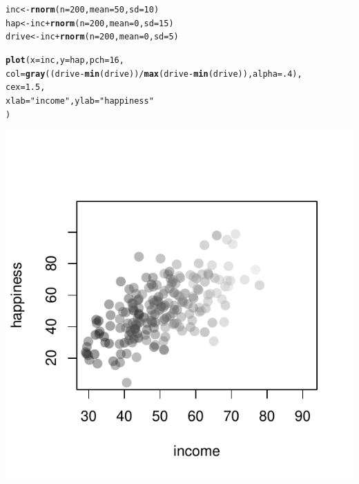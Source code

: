 \documentclass{tufte-book}\usepackage[]{graphicx}\usepackage[]{color}
\makeatletter
\def\maxwidth{ %
  \ifdim\Gin@nat@width>\linewidth
    \linewidth
  \else
    \Gin@nat@width
  \fi
}
\newcommand{\hlnum}[1]{\textcolor[rgb]{0.686,0.059,0.569}{#1}}%
\newcommand{\hlstr}[1]{\textcolor[rgb]{0.192,0.494,0.8}{#1}}%
\newcommand{\hlopt}[1]{\textcolor[rgb]{0,0,0}{#1}}%
\newcommand{\hlstd}[1]{\textcolor[rgb]{0.345,0.345,0.345}{#1}}%
\newcommand{\hlkwb}[1]{\textcolor[rgb]{0.69,0.353,0.396}{#1}}%
\newcommand{\hlkwc}[1]{\textcolor[rgb]{0.333,0.667,0.333}{#1}}%
\newcommand{\hlkwd}[1]{\textcolor[rgb]{0.737,0.353,0.396}{\textbf{#1}}}%
\newenvironment{kframe}{%
 \def\at@end@of@kframe{}%
 \ifinner\ifhmode%
  \def\at@end@of@kframe{\end{minipage}}%
  \begin{minipage}{\columnwidth}%
 \fi\fi%
 \def\FrameCommand##1{\hskip\@totalleftmargin \hskip-\fboxsep
 \colorbox{shadecolor}{##1}\hskip-\fboxsep
     \hskip-\linewidth \hskip-\@totalleftmargin \hskip\columnwidth}%
 \MakeFramed {\advance\hsize-\width
   \@totalleftmargin\z@ \linewidth\hsize
   \@setminipage}}%
 {\par\unskip\endMakeFramed%
 \at@end@of@kframe}
\newenvironment{knitrout}{}{} %
\makeatother
\begin{document}
\begin{footnotesize}
\begin{marginfigure}

\begin{tiny}
\begin{knitrout}
\color{fgcolor}\begin{kframe}
\begin{alltt}
\hlstd{inc} \hlkwb{<-} \hlkwd{rnorm}\hlstd{(}\hlkwc{n} \hlstd{=} \hlnum{200}\hlstd{,} \hlkwc{mean} \hlstd{=} \hlnum{50}\hlstd{,} \hlkwc{sd} \hlstd{=} \hlnum{10}\hlstd{)}
\hlstd{hap} \hlkwb{<-} \hlstd{inc} \hlopt{+} \hlkwd{rnorm}\hlstd{(}\hlkwc{n} \hlstd{=} \hlnum{200}\hlstd{,} \hlkwc{mean} \hlstd{=} \hlnum{0}\hlstd{,} \hlkwc{sd} \hlstd{=} \hlnum{15}\hlstd{)}
\hlstd{drive} \hlkwb{<-} \hlstd{inc} \hlopt{+} \hlkwd{rnorm}\hlstd{(}\hlkwc{n} \hlstd{=} \hlnum{200}\hlstd{,} \hlkwc{mean} \hlstd{=} \hlnum{0}\hlstd{,} \hlkwc{sd} \hlstd{=} \hlnum{5}\hlstd{)}

\hlkwd{plot}\hlstd{(}\hlkwc{x} \hlstd{= inc,} \hlkwc{y} \hlstd{= hap,} \hlkwc{pch} \hlstd{=} \hlnum{16}\hlstd{,}
     \hlkwc{col} \hlstd{=} \hlkwd{gray}\hlstd{((drive} \hlopt{-} \hlkwd{min}\hlstd{(drive))} \hlopt{/} \hlkwd{max}\hlstd{(drive} \hlopt{-} \hlkwd{min}\hlstd{(drive)),} \hlkwc{alpha} \hlstd{=} \hlnum{.4}\hlstd{),}
     \hlkwc{cex} \hlstd{=} \hlnum{1.5}\hlstd{,}
     \hlkwc{xlab} \hlstd{=} \hlstr{"income"}\hlstd{,} \hlkwc{ylab} \hlstd{=} \hlstr{"happiness"}
     \hlstd{)}
\end{alltt}
\end{kframe}
\includegraphics[width=\maxwidth]{figure/unnamed-chunk-175-1} 


\end{knitrout}
\end{tiny}
\end{marginfigure}
\end{footnotesize}
\end{document}
